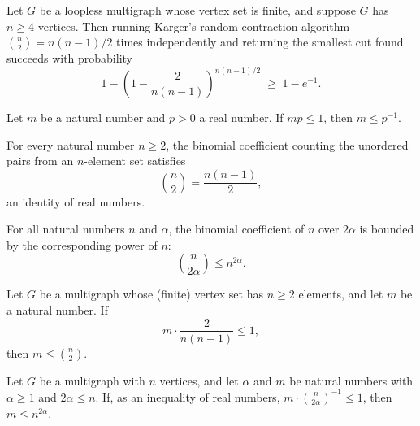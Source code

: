 \begin{theorem}
\label{karger_whp}
\leanok
{}
Let $G$ be a loopless multigraph whose vertex set is finite, and suppose $G$ has $n \ge
4$ vertices. Then running Karger's random-contraction algorithm $\binom{n}{2} =
n(n-1)/2$ times independently and returning the smallest cut found succeeds with
probability
\[
  1 - \left(1 - \frac{2}{n(n-1)}\right)^{n(n-1)/2} \;\ge\; 1 - e^{-1}.
\]
\end{theorem}

\begin{lemma}
\label{card_le_of_disjoint_prob_lb}
\leanok
{}
Let $m$ be a natural number and $p > 0$ a real number. If $m p \le 1$, then $m \le
p^{-1}$.
\end{lemma}

\begin{lemma}
\label{choose_two}
\leanok
{}
For every natural number $n \ge 2$, the binomial coefficient counting the unordered
pairs from an $n$-element set satisfies
\[
  \binom{n}{2} = \frac{n(n-1)}{2},
\]
an identity of real numbers.
\end{lemma}

\begin{lemma}
\label{choose_le_pow}
\leanok
{}
For all natural numbers $n$ and $\alpha$, the binomial coefficient of $n$ over $2\alpha$
is bounded by the corresponding power of $n$: \[\binom{n}{2\alpha} \le n^{2\alpha}.\]
\end{lemma}

\begin{theorem}
\label{num_mincuts_le_choose}
\leanok
{}
Let $G$ be a multigraph whose (finite) vertex set has $n \ge 2$ elements, and let $m$ be
a natural number. If
\[
  m \cdot \frac{2}{n(n-1)} \le 1,
\]
then $m \le \binom{n}{2}$.
\end{theorem}

\begin{theorem}
\label{num_alpha_mincuts_le}
\leanok
{}
Let $G$ be a multigraph with $n$ vertices, and let $\alpha$ and $m$ be natural numbers
with $\alpha \ge 1$ and $2\alpha \le n$. If, as an inequality of real numbers, $m \cdot
\binom{n}{2\alpha}^{-1} \le 1$, then $m \le n^{2\alpha}$.
\end{theorem}

